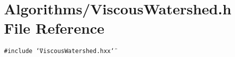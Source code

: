 \section{Algorithms/Viscous\-Watershed.h File Reference}
\label{ViscousWatershed_8h}
{\tt \#include \char`\"{}Viscous\-Watershed.hxx\char`\"{}}\par
